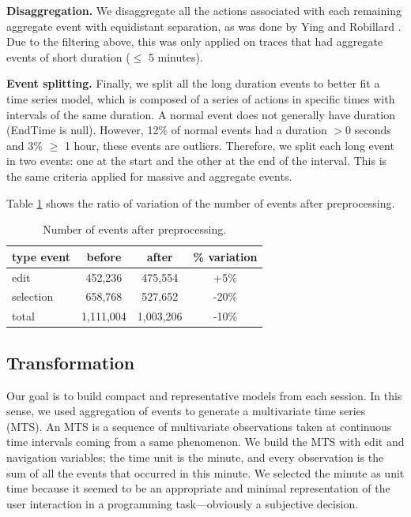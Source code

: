 \documentclass[times]{smrauth}
\begin{document}
\textbf{Disaggregation.} We disaggregate all the actions associated with each remaining aggregate event with equidistant separation, as was done by Ying and Robillard \cite{YR11}. Due to the filtering above, this was only applied on traces that had aggregate events of short duration ($\leq$ 5 minutes).

\textbf{Event splitting.} Finally, we split all the long duration events to better fit a time series model, which is composed of a series of actions in specific times with intervals of the same duration. A normal event does not generally have duration (EndTime is null). However, 12\% of normal events  had a duration $> 0$ seconds and 3\% $\geq$ 1 hour, these events are outliers. Therefore, we split each long event in two events: one at the start and the other at the end of the interval. This is the same criteria applied for massive and aggregate events.

Table \ref{tbl:mass_events} shows the ratio of variation of the number of events after preprocessing.

\begin{table}[hb!]
	\small
	\renewcommand{\arraystretch}{1.3}
	\caption{Number of events after preprocessing.}
	\label{tbl:mass_events}
	\centering
	\begin{tabular}{l | c | c | c } 
		type event & before & after & \% variation  \\  
		\hline 
		edit &	 452,236 & 475,554 &	+5\%   \\
		selection &	658,768 & 527,652 & -20\%   \\
		\hline
		total & 1,111,004 & 1,003,206 & -10\%  \\
	\end{tabular}
\end{table}

\subsection{Transformation}
Our goal is to build compact and representative models from each session. In this sense, we used aggregation of events to generate a multivariate time series (MTS). An MTS is a sequence of multivariate observations taken at continuous time intervals coming from a same phenomenon. We build the MTS with edit and navigation variables; the time unit is the minute, and every observation is the sum of all the events that occurred in this minute. We selected the minute as unit time because it seemed to be an appropriate and minimal representation of the user interaction in a programming task---obviously a subjective decision. 
\end{document}
